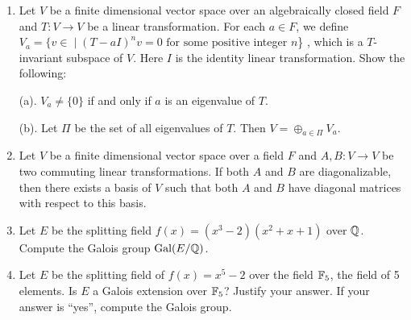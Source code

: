 \documentclass{article}
\begin{document}
\begin{Large}
\begin{enumerate}
\clearpage

\item Let $ V $ be a finite dimensional vector space over an
algebraically closed field $ F $ and  $ T : V \rightarrow V $ be a
linear transformation. For each $ a \in F $, we define 
$ V_a=\{ v \in \; | \; (T-aI)^n v=0 \mbox{ for some positive}      $
\linebreak integer $n$\} , which is a $T$-invariant     
subspace of $V$. Here $ I$ is the identity linear transformation.
Show the  following:

(a). $ V_a \neq \{ 0 \} $ if and only if $ a $ is an eigenvalue of $ T
$.

(b). Let $ \Pi $ be the set of all eigenvalues of $ T $. Then $ V=
\oplus_{a \in \Pi} V_a $.

\item  Let $V $ be a finite dimensional vector space over a field $ F $ and 
$ A, B : V \rightarrow V $ be two commuting linear transformations. If
both $ A$ and $ B$ are  diagonalizable, then  there exists a basis of $ V $
such that  both  $A$ and $B$ have  diagonal matrices with
respect to this basis. 

\item Let $E$ be the splitting field $ f(x)=(x^3-2)(x^2+x+1)$ 
over $\Bbb Q$. Compute the Galois group $ \mbox{Gal}(E/\Bbb Q)$.

\item Let $E$ be the splitting field of $f(x)=x^5-2 $ over the field 
$ \Bbb F_5$, the field of 5 elements. Is $E$ a Galois extension 
over $\Bbb F_5$? Justify your
answer. If your answer is ``yes'',  compute the Galois group.  


\end{enumerate}
\end{Large}
\end{document}
